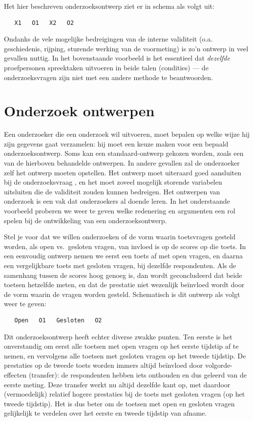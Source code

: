 \documentclass[
]{book}
\begin{document}
Het hier beschreven onderzoeksontwerp ziet er in schema als volgt uit:

\begin{verbatim}
   X1   O1   X2   O2
\end{verbatim}

Ondanks de vele mogelijke bedreigingen van de interne validiteit (o.a.
geschiedenis, rijping, sturende werking van de voormeting) is zo'n
ontwerp in veel gevallen nuttig. In het bovenstaande voorbeeld is het
essentieel dat \emph{dezelfde} proefpersonen spreektaken uitvoeren in beide
talen (condities) --- de onderzoeksvragen zijn niet met een andere
methode te beantwoorden.

\hypertarget{onderzoek-ontwerpen}{%
\section{Onderzoek ontwerpen}\label{onderzoek-ontwerpen}}

Een onderzoeker die een onderzoek wil uitvoeren, moet bepalen op welke
wijze hij zijn gegevens gaat verzamelen: hij moet een keuze maken voor
een bepaald onderzoeksontwerp. Soms kan een standaard-ontwerp gekozen
worden, zoals een van de hierboven behandelde ontwerpen. In andere
gevallen zal de onderzoeker zelf het ontwerp moeten opstellen. Het
ontwerp moet uiteraard goed aansluiten bij de onderzoeksvraag
\citep{Levin99}, en het moet zoveel mogelijk storende variabelen uitsluiten
die de validiteit zouden kunnen bedreigen. Het ontwerpen van onderzoek
is een vak dat onderzoekers al doende leren. In het onderstaande
voorbeeld proberen we weer te geven welke redenering en argumenten een
rol spelen bij de ontwikkeling van een onderzoeksontwerp.

Stel je voor dat we willen onderzoeken of de vorm waarin toetsvragen
gesteld worden, als open vs.~gesloten vragen, van invloed is op de
scores op die toets. In een eenvoudig ontwerp nemen we eerst een toets
af met open vragen, en daarna een vergelijkbare toets met gesloten
vragen, bij dezelfde respondenten. Als de samenhang tussen de scores
hoog genoeg is, dan wordt geconcludeerd dat beide toetsen hetzelfde
meten, en dat de prestatie niet wezenlijk beïnvloed wordt door de vorm
waarin de vragen worden gesteld. Schematisch is dit ontwerp als volgt
weer te geven:

\begin{verbatim}
   Open   O1   Gesloten   O2
\end{verbatim}

Dit onderzoeksontwerp heeft echter diverse zwakke punten. Ten eerste is
het onverstandig om eerst alle toetsen met open vragen op het eerste
tijdstip af te nemen, en vervolgens alle toetsen met gesloten vragen op
het tweede tijdstip. De prestaties op de tweede toets worden immers
altijd beïnvloed door volgorde-effecten (transfer): de respondenten
hebben iets onthouden en dus geleerd van de eerste meting. Deze transfer
werkt nu altijd dezelfde kant op, met daardoor (vermoedelijk) relatief
hogere prestaties bij de toets met gesloten vragen (op het tweede
tijdstip). Het is dus beter om de toetsen met open en gesloten vragen
gelijkelijk te verdelen over het eerste en tweede tijdstip van afname.
\end{document}
